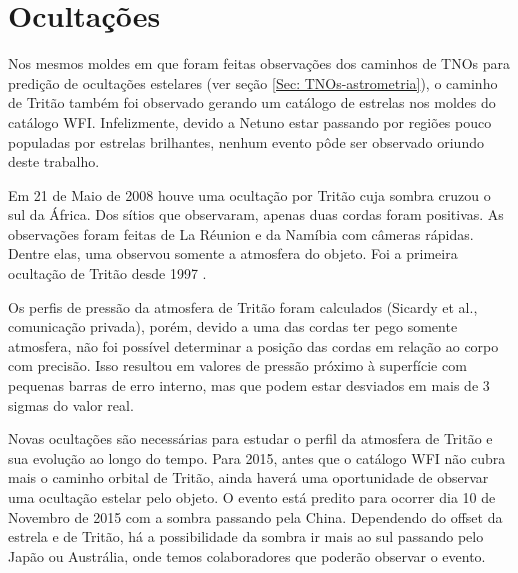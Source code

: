 \documentclass[12pt,a4paper]{report}
\newcommand{\arcsec}{\ensuremath{^{\prime\prime}}}%
\begin{document}



\section{Ocultaç\~oes}
\label{Sec: Netuno-predic}

\indent \indent Nos mesmos moldes em que foram feitas observações dos caminhos de TNOs para predição de ocultações estelares (ver seção \ref{Sec: TNOs-astrometria}), o caminho de Tritão também foi observado gerando um catálogo de estrelas nos moldes do catálogo WFI. Infelizmente, devido a Netuno estar passando por regiões pouco populadas por estrelas brilhantes, nenhum evento pôde ser observado oriundo deste trabalho.


Em 21 de Maio de 2008 houve uma ocultação por Tritão cuja sombra cruzou o sul da África. Dos sítios que observaram, apenas duas cordas foram positivas. As observações foram feitas de La Réunion e da Namíbia com câmeras rápidas. Dentre elas, uma observou somente a atmosfera do objeto. Foi a primeira ocultação de Tritão desde 1997 \citep{Elliot2000}.

Os perfis de pressão da atmosfera de Tritão foram calculados (Sicardy et al., comunicação privada), porém, devido a uma das cordas ter pego somente atmosfera, não foi possível determinar a posição das cordas em relação ao corpo com precisão. Isso resultou em valores de pressão próximo à superfície com pequenas barras de erro interno, mas que podem estar desviados em mais de 3 sigmas do valor real.

Novas ocultações são necessárias para estudar o perfil da atmosfera de Tritão e sua evolução ao longo do tempo. Para 2015, antes que o catálogo WFI não cubra mais o caminho orbital de Tritão, ainda haverá uma oportunidade de observar uma ocultação estelar pelo objeto. O evento está predito para ocorrer dia 10 de Novembro de 2015 com a sombra passando pela China. Dependendo do offset da estrela e de Tritão, há a possibilidade da sombra ir mais ao sul passando pelo Japão ou Austrália, onde temos colaboradores que poderão observar o evento.
\end{document}
